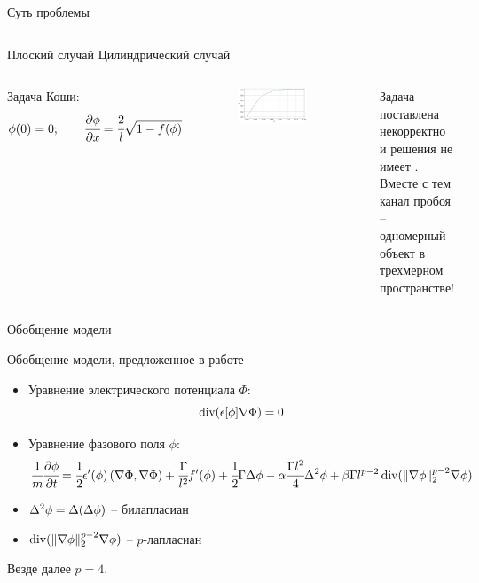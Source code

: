 \begin{frame}{Суть проблемы}
\begin{columns}
	\centering
	Плоский случай
	\centering
	Цилиндрический случай
\end{columns}
\vspace{0.5cm}
\begin{columns}
	Задача Коши:
	\vspace{-0.3cm}
	$$\phi(0) = 0; \qquad \cfrac{\partial \phi}{\partial x} = \cfrac{2}{l} \sqrt{1 - f(\phi)}$$
	\vspace{-0.3cm}
	\begin{figure}
		\includegraphics[width=\textwidth]{figures/result_volumes.png}
	\end{figure}
	\rule{0.4pt}{0.7\textheight}
	\centering
	Задача поставлена некорректно \\ и решения не имеет \cite{zipunova_higher_codimension}. \\[0.2cm]
	Вместе с тем канал пробоя -- одномерный объект в трехмерном пространстве!
\end{columns}
\end{frame}


\begin{frame}{Обобщение модели}
\vspace{-0.3cm}
\begin{block}{Обобщение модели, предложенное в работе \cite{zipunova_higher_codimension}}
\begin{itemize}
	\item Уравнение электрического потенциала $\Phi$:
	$$\operatorname{{div}}(\epsilon[\phi] \nabla \Phi) = 0$$
	\item Уравнение фазового поля $\phi$:
	$$\cfrac{1}{m} \cfrac{\partial \phi}{\partial t} = \cfrac{1}{2} \epsilon'(\phi) \left( \nabla \Phi, \nabla \Phi \right) + \cfrac{\Gamma}{l^2} f'(\phi) + \cfrac{1}{2} \Gamma \Delta \phi - \alpha \cfrac{\Gamma l^2}{4} \Delta^2 \phi + \beta \Gamma l^{p - 2} \operatorname{{div}}(\| \nabla \phi \|_2^{p - 2} \nabla \phi)$$
\end{itemize}
\end{block}
\begin{itemize}
	\item $\Delta^2 \phi = \Delta(\Delta \phi)$ -- билапласиан
	\item $\operatorname{{div}}(\| \nabla \phi \|_2^{p - 2} \nabla \phi)$ -- $p$-лапласиан
\end{itemize}
Везде далее $p = 4$.
\end{frame}


